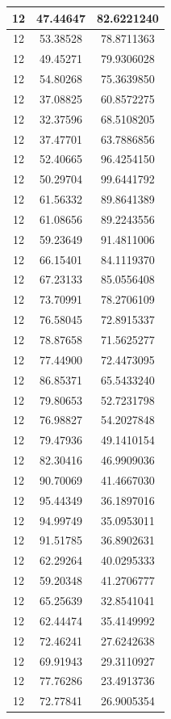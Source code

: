 \documentclass[
]{book}
\begin{document}
\begin{tabular}{c|c|c}
\hline
12 & 47.44647 & 82.6221240\\
\hline
12 & 53.38528 & 78.8711363\\
\hline
12 & 49.45271 & 79.9306028\\
\hline
12 & 54.80268 & 75.3639850\\
\hline
12 & 37.08825 & 60.8572275\\
\hline
12 & 32.37596 & 68.5108205\\
\hline
12 & 37.47701 & 63.7886856\\
\hline
12 & 52.40665 & 96.4254150\\
\hline
12 & 50.29704 & 99.6441792\\
\hline
12 & 61.56332 & 89.8641389\\
\hline
12 & 61.08656 & 89.2243556\\
\hline
12 & 59.23649 & 91.4811006\\
\hline
12 & 66.15401 & 84.1119370\\
\hline
12 & 67.23133 & 85.0556408\\
\hline
12 & 73.70991 & 78.2706109\\
\hline
12 & 76.58045 & 72.8915337\\
\hline
12 & 78.87658 & 71.5625277\\
\hline
12 & 77.44900 & 72.4473095\\
\hline
12 & 86.85371 & 65.5433240\\
\hline
12 & 79.80653 & 52.7231798\\
\hline
12 & 76.98827 & 54.2027848\\
\hline
12 & 79.47936 & 49.1410154\\
\hline
12 & 82.30416 & 46.9909036\\
\hline
12 & 90.70069 & 41.4667030\\
\hline
12 & 95.44349 & 36.1897016\\
\hline
12 & 94.99749 & 35.0953011\\
\hline
12 & 91.51785 & 36.8902631\\
\hline
12 & 62.29264 & 40.0295333\\
\hline
12 & 59.20348 & 41.2706777\\
\hline
12 & 65.25639 & 32.8541041\\
\hline
12 & 62.44474 & 35.4149992\\
\hline
12 & 72.46241 & 27.6242638\\
\hline
12 & 69.91943 & 29.3110927\\
\hline
12 & 77.76286 & 23.4913736\\
\hline
12 & 72.77841 & 26.9005354\\

\end{tabular}
\end{document}
